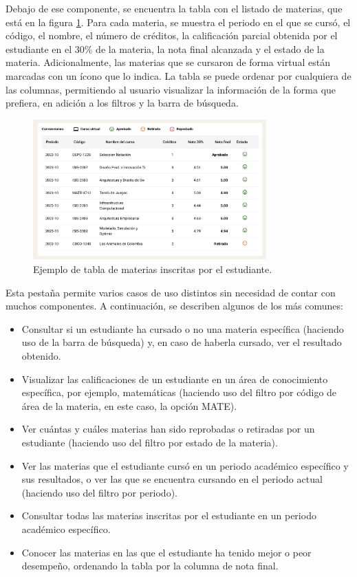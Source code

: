 Debajo de ese componente, se encuentra la tabla con el listado de materias, que está en la figura \ref{fig:tabla_materias}. Para cada materia, se muestra el periodo en el que se cursó, el código, el nombre, el número de créditos, la calificación parcial obtenida por el estudiante en el 30\% de la materia, la nota final alcanzada y el estado de la materia. Adicionalmente, las materias que se cursaron de forma virtual están marcadas con un ícono que lo indica. La tabla se puede ordenar por cualquiera de las columnas, permitiendo al usuario visualizar la información de la forma que prefiera, en adición a los filtros y la barra de búsqueda.

\begin{figure}[H]
  \centering
  \includegraphics[width=0.8\textwidth]{img/nes/tabla_materias.png}
  \caption{Ejemplo de tabla de materias inscritas por el estudiante.}
  \label{fig:tabla_materias}
\end{figure}

Esta pestaña permite varios casos de uso distintos sin necesidad de contar con muchos componentes. A continuación, se describen algunos de los más comunes:
\begin{itemize}
  \item Consultar si un estudiante ha cursado o no una materia específica (haciendo uso de la barra de búsqueda) y, en caso de haberla cursado, ver el resultado obtenido.
  \item Visualizar las calificaciones de un estudiante en un área de conocimiento específica, por ejemplo, matemáticas (haciendo uso del filtro por código de área de la materia, en este caso, la opción MATE).
  \item Ver cuántas y cuáles materias han sido reprobadas o retiradas por un estudiante (haciendo uso del filtro por estado de la materia).
  \item Ver las materias que el estudiante cursó en un periodo académico específico y sus resultados, o ver las que se encuentra cursando en el periodo actual (haciendo uso del filtro por periodo).
  \item Consultar todas las materias inscritas por el estudiante en un periodo académico específico.
  \item Conocer las materias en las que el estudiante ha tenido mejor o peor desempeño, ordenando la tabla por la columna de nota final.
\end{itemize}

